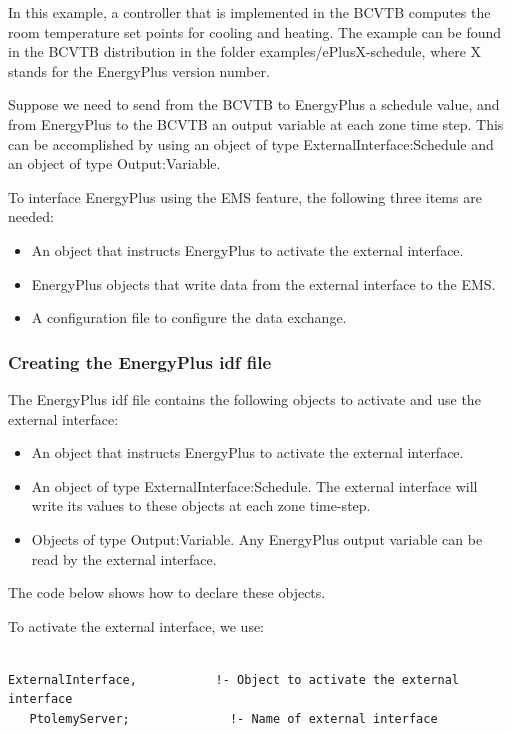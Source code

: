 In this example, a controller that is implemented in the BCVTB computes the room temperature set points for cooling and heating. The example can be found in the BCVTB distribution in the folder examples/ePlusX-schedule, where X stands for the EnergyPlus version number.

Suppose we need to send from the BCVTB to EnergyPlus a schedule value, and from EnergyPlus to the BCVTB an output variable at each zone time step. This can be accomplished by using an object of type ExternalInterface:Schedule and an object of type Output:Variable.

To interface EnergyPlus using the EMS feature, the following three items are needed:

\begin{itemize}
\item
  An object that instructs EnergyPlus to activate the external interface.
\item
  EnergyPlus objects that write data from the external interface to the EMS.
\item
  A configuration file to configure the data exchange.
\end{itemize}

\subsubsection{Creating the EnergyPlus idf file}\label{creating-the-energyplus-idf-file}

The EnergyPlus idf file contains the following objects to activate and use the external interface:

\begin{itemize}
\item
  An object that instructs EnergyPlus to activate the external interface.
\item
  An object of type ExternalInterface:Schedule. The external interface will write its values to these objects at each zone time-step.
\item
  Objects of type Output:Variable. Any EnergyPlus output variable can be read by the external interface.
\end{itemize}

The code below shows how to declare these objects.

To activate the external interface, we use:

\begin{lstlisting}

ExternalInterface,           !- Object to activate the external interface
   PtolemyServer;              !- Name of external interface
\end{lstlisting}

